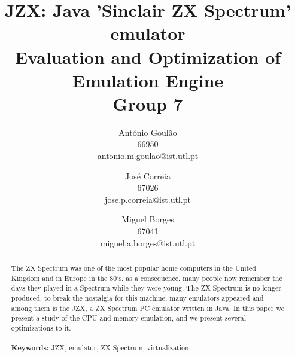 \documentclass[times, 10pt,twocolumn]{scrartcl}
\begin{document}
\title{JZX: Java 'Sinclair ZX Spectrum' emulator\\
Evaluation and Optimization of Emulation Engine\\
Group 7}

\author{Ant\'{o}nio Goul\~{a}o\\
66950\\
antonio.m.goulao@ist.utl.pt\\
%
\and
Jos\'{e} Correia\\
67026\\
jose.p.correia@ist.utl.pt
%
  \and
  Miguel Borges\\
  67041\\
  miguel.a.borges@ist.utl.pt\\
}

\maketitle
\thispagestyle{empty}

\begin{abstract}
  The ZX Spectrum was one of the most popular home computers in the United Kingdom and in Europe in the 80’s, as a consequence, many people now remember the days they played in a Spectrum while they were young. The ZX Spectrum is no longer produced, to break the nostalgia for this machine, many emulators appeared and among them is the JZX, a ZX Spectrum PC emulator written in Java. In this paper we present a study of the CPU and memory emulation, and we present several optimizations to it.\\
  \\
  \textbf{Keywords:} JZX, emulator, ZX Spectrum, virtualization.\\
\end{abstract}
\end{document}
